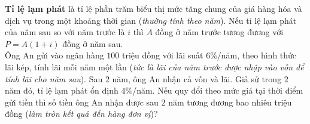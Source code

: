 \begin{ex}%
	\textbf{Tỉ lệ lạm phát} là tỉ lệ phần trăm biểu thị mức tăng chung của giá hàng hóa và dịch vụ trong một khoảng thời gian (\textit{thường tính theo năm}). Nếu tỉ lệ lạm phát của năm sau so với năm trước là $i$ thì $A$ đồng ở năm trước tương đương với $P=A(1+i)$ đồng ở năm sau.\\
	Ông An gửi vào ngân hàng $100$ triệu đồng với lãi suất $6\%$/năm, theo hình thức lãi kép, tính lãi mỗi năm một lần (\textit{tức là lãi của năm trước được nhập vào vốn để tính lãi cho năm sau}). Sau $2$ năm, ông An nhận cả vốn và lãi. Giả sử trong $2$ năm đó, tỉ lệ lạm phát ổn định $4\%$/năm. Nếu quy đổi theo mức giá tại thời điểm gửi tiền thì số tiền ông An nhận được sau $2$ năm tương đương bao nhiêu triệu đồng (\textit{làm tròn kết quả đến hàng đơn vị})?
\end{ex}


